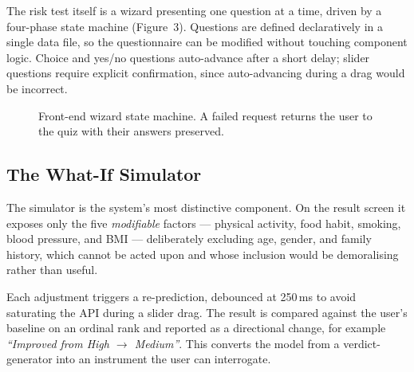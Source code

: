 \documentclass[11pt,a4paper]{article}
\begin{document}
The risk test itself is a wizard presenting one question at a time, driven by a
four-phase state machine (Figure~3). Questions are defined declaratively in a
single data file, so the questionnaire can be modified without touching
component logic. Choice and yes/no questions auto-advance after a short delay;
slider questions require explicit confirmation, since auto-advancing during a
drag would be incorrect.

\begin{figure}[h!]
\centering
{}
\caption{Front-end wizard state machine. A failed request returns the user to
the quiz with their answers preserved.}
\end{figure}

\subsection{The What-If Simulator}
The simulator is the system's most distinctive component. On the result screen
it exposes only the five \emph{modifiable} factors --- physical activity, food
habit, smoking, blood pressure, and BMI --- deliberately excluding age, gender,
and family history, which cannot be acted upon and whose inclusion would be
demoralising rather than useful.

Each adjustment triggers a re-prediction, debounced at 250\,ms to avoid
saturating the API during a slider drag. The result is compared against the
user's baseline on an ordinal rank and reported as a directional change, for
example \textit{``Improved from High $\rightarrow$ Medium''}. This converts the
model from a verdict-generator into an instrument the user can interrogate.
\end{document}
